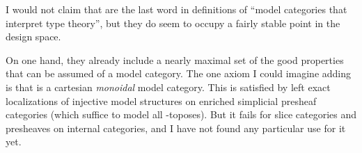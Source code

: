 \begin{verbose}
\begin{rmk}
  I would not claim that \ttmts are the last word in definitions of ``model categories that interpret type theory'', but they do seem to occupy a fairly stable point in the design space.
  
  On one hand, they already include a nearly maximal set of the good properties that can be assumed of a model category.
  The one axiom I could imagine adding is that \E is a cartesian \emph{monoidal} model category.
  This is satisfied by left exact localizations of injective model structures on enriched simplicial presheaf categories (which suffice to model all \io-toposes).
  But it fails for slice categories and presheaves on internal categories, and I have not found any particular use for it yet.


\end{rmk}
\end{verbose}
